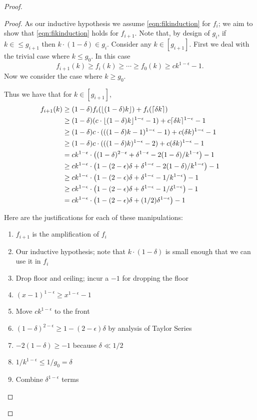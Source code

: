 \documentclass[twocolumn]{article}[10pt]
\DeclarePairedDelimiter\ceil{\lceil}{\rceil}
\DeclarePairedDelimiter\floor{\lfloor}{\rfloor}
\begin{document}
\begin{proof}
\begin{proof}
  As our inductive hypothesis we assume
  \eqref{eqn:fikinduction} for $f_i$; we aim to show that 
  \eqref{eqn:fikinduction} holds for $f_{i+1}$. Note that, by
  design of $g_i$, if $k \in \le g_{i+1}$ then $k\cdot (1-\delta) \in g_i$.
  Consider any $k\in [g_{i+1}]$. First we deal with the trivial
  case where $k \le g_0$. In this case 
  $$f_{i+1}(k) \ge f_i(k) \ge \cdots \ge f_0(k) \ge ck^{1-\epsilon} -1.$$
  Now we consider the case where $k \ge g_0$.

  Thus we have that for $k\in [g_{i+1}]$,
  \begin{align*}
    f_{i+1}(k) &\ge (1-\delta) f_i(\floor{(1-\delta)k}) + f_i(\ceil{\delta k})  \\ 
    &\ge (1-\delta) (c \cdot\floor{(1-\delta)k}^{1-\epsilon}-1) + c\ceil{\delta k}^{1-\epsilon} - 1  \\ 
    &\ge (1-\delta) c \cdot (((1-\delta)k-1)^{1-\epsilon}-1) + c(\delta k)^{1-\epsilon}-1 \\ 
    &\ge (1-\delta) c \cdot (((1-\delta)k)^{1-\epsilon}-2) + c(\delta k)^{1-\epsilon}-1 \\ 
    &= ck^{1-\epsilon} \cdot\left((1-\delta)^{2-\epsilon} + \delta^{1-\epsilon} - 2(1-\delta)/k^{1-\epsilon} \right) -1\\ 
    &\ge ck^{1-\epsilon} \cdot\left(1-(2-\epsilon)\delta + \delta^{1-\epsilon} - 2(1-\delta)/k^{1-\epsilon} \right)-1\\ 
    &\ge ck^{1-\epsilon} \cdot\left(1-(2-\epsilon)\delta + \delta^{1-\epsilon} - 1/k^{1-\epsilon} \right) -1\\ 
    &\ge ck^{1-\epsilon} \cdot\left(1-(2-\epsilon)\delta + \delta^{1-\epsilon} - 1/\delta^{1-\epsilon} \right)-1\\ 
    &= ck^{1-\epsilon} \cdot\left(1-(2-\epsilon)\delta + (1/2)\delta^{1-\epsilon}\right)-1 
  \end{align*}

  Here are the justifications for each of these manipulations: 
  \begin{enumerate}
    \item $f_{i+1}$ is the amplification of $f_i$
    \item Our inductive hypothesis; note that $k\cdot (1-\delta)$ is small enough that we can use it in $f_i$
    \item Drop floor and ceiling; incur a $-1$ for dropping the floor
    \item $(x-1)^{1-\epsilon} \ge x^{1-\epsilon} -1$
    \item Move $ck^{1-\epsilon}$ to the front
    \item $(1-\delta)^{2-\epsilon} \ge 1-(2-\epsilon)\delta$ by analysis of Taylor Series
    \item $-2(1-\delta) \ge -1$ because $\delta \ll 1/2$
    \item $1/k^{1-\epsilon} \le 1/g_0 = \delta$
    \item Combine $\delta^{1-\epsilon}$ terms
  \end{enumerate}


\end{proof}
\end{proof}
\end{document}
